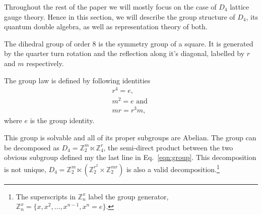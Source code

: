 \documentclass[two column]{article}
\begin{document}
Throughout the rest of the paper we will mostly focus on the case of $D_4$ lattice gauge theory.
Hence in this section, we will describe the group structure of $D_4$, its quantum double algebra, as well as representation theory of both.

The dihedral group of order 8 is the symmetry group of a square. It is generated by the quarter turn rotation and the reflection along it's diagonal, labelled by $r$ and $m$ respectively.

The group law is defined by following identities
\begin{equation}
	\begin{split}
		r^4 = e,\\
		m^2 = e \text{ and }\\
		mr = r^3m, \label{eqn:group}
	\end{split}
\end{equation}
where $e$ is the group identity.

This group is solvable and all of its proper subgroups are Abelian. The group can be decomposed as $D_4 = \mathbb{Z}^m_2 \ltimes \mathbb{Z}^r_4$, the semi-direct product between the two obvious subgroup defined my the last line in Eq.~\eqref{eqn:group}.
This decomposition is not unique, $D_4 = \mathbb{Z}_2^m\ltimes(\mathbb{Z}_2^{r^2}\times\mathbb{Z}^{mr}_2)$ is also a valid decomposition.\footnote{The superscripts in $\mathbb{Z}_n^x$ label the group generator, $\mathbb{Z}_n^x = \{x, x^2, \ldots, x^{n-1}, x^n = e\}$.}
\end{document}

